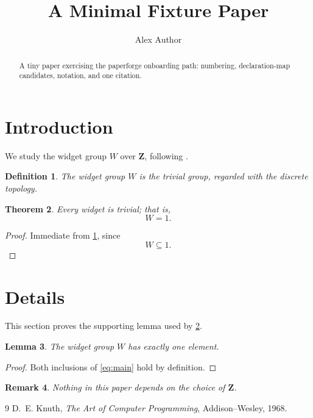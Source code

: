 \documentclass{amsart}
\title{A Minimal Fixture Paper}
\author{Alex Author}
\newtheorem{theorem}{Theorem}[section]
\newtheorem{lemma}[theorem]{Lemma}
\newtheorem{definition}[theorem]{Definition}
\newtheorem{remark}[theorem]{Remark}
\newcommand{\wid}{W}
\newcommand{\Zint}{\mathbf{Z}}
\begin{document}
\begin{abstract}
  A tiny paper exercising the paperforge onboarding path: numbering,
  declaration-map candidates, notation, and one citation.
\end{abstract}

\maketitle

\section{Introduction}\label{sec:intro}

We study the widget group $\wid$ over $\Zint$, following \cite{Knuth}.

\begin{definition}\label{def:widget}
  The \emph{widget group} $\wid$ is the trivial group, regarded with the
  discrete topology.
\end{definition}

\begin{theorem}\label{thm:main}
  Every widget is trivial; that is,
  \begin{equation}\label{eq:main}
    \wid = 1.
  \end{equation}
\end{theorem}

\begin{proof}
  Immediate from \cref{def:widget}, since
  \[
    \wid \subseteq 1 .
  \]
\end{proof}

\section{Details}\label{sec:details}

This section proves the supporting lemma used by \cref{thm:main}.

\begin{lemma}\label{lem:helper}
  The widget group $\wid$ has exactly one element.
\end{lemma}

\begin{proof}
  Both inclusions of \cref{eq:main} hold by definition.
\end{proof}

\begin{remark}\label{rem:note}
  Nothing in this paper depends on the choice of $\Zint$.
\end{remark}

\begin{thebibliography}{9}
 D.~E. Knuth, \emph{The Art of Computer Programming},
  Addison--Wesley, 1968.
\end{thebibliography}
\end{document}

